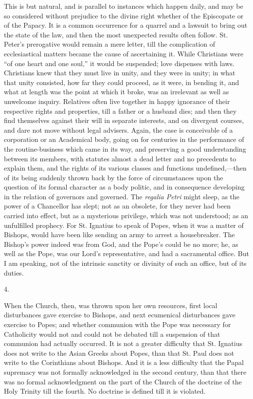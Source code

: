 This is but natural, and is parallel to instances
which happen daily, and may be so considered without
prejudice to the divine right whether of the Episcopate
or of the Papacy. It is a common occurrence for a quarrel
and a lawsuit to bring out the state of the law, and then
the most unexpected results often follow. St. Peter's
prerogative would remain a mere letter, till the
complication of ecclesiastical matters became the cause
of ascertaining it. While Christians were ``of one
heart and one soul,'' it would be suspended; love
dispenses with laws. Christians knew that they must live
in unity, and they were in unity; in what that unity
consisted, how far they could proceed, as it were, in
bending it, and what at length was the point at which it
broke, was an irrelevant as well as unwelcome inquiry.
Relatives often live together in happy ignorance of their
respective rights and properties, till a father or a
husband dies; and then they find themselves against their
will in separate interests, and on divergent courses, and
dare not move without legal advisers. Again, the case is
conceivable of a corporation or an Academical body, going
on for centuries in the performance of the
routine-business which came in its way, and preserving a
good understanding between its members, with statutes
almost a dead letter and no precedents to explain them,
and the rights of its various classes and functions
undefined,—then of its being suddenly thrown back by
the force of circumstances upon the question of its
formal character as a body politic, and in consequence
developing in the relation of governors and governed. The
\emph{regalia Petri} might sleep, as the power of a
Chancellor has slept; not as an obsolete, for they never
had been carried into effect, but as a mysterious
privilege, which was not understood; as an unfulfilled
prophecy. For St. Ignatius to speak of Popes, when it was
a matter of Bishops, would have been like sending an army
to arrest a housebreaker. The Bishop's power indeed was
from God, and the Pope's could be no more; he, as well as
the Pope, was our Lord's representative, and had a
sacramental office. But I am speaking, not of the
intrinsic sanctity or divinity of such an office, but of
its duties.

4.

When the Church, then, was thrown upon her own
resources, first local disturbances gave exercise to
Bishops, and next ecumenical disturbances gave exercise
to Popes; and whether communion with the Pope was
necessary for Catholicity would not and could not be
debated till a suspension of that communion had actually
occurred. It is not a greater difficulty that St.
Ignatius does not write to the Asian Greeks about Popes,
than that St. Paul does not write to the Corinthians
about Bishops. And it is a less difficulty that the Papal
supremacy was not formally acknowledged in the second
century, than that there was no formal acknowledgment on
the part of the Church of the doctrine of the Holy
Trinity till the fourth. No doctrine is defined till it
is violated.

